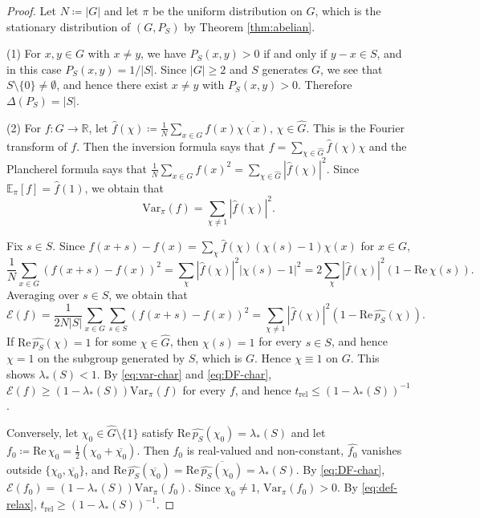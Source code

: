 \documentclass[a4paper, reqno, 11pt]{amsart}
\theoremstyle{definition}
\begin{document}
\begin{proof}
Let $N \coloneqq |G|$ and let $\pi$ be the uniform distribution on $G$, which is the stationary distribution of $(G, P_{S})$ by Theorem \ref{thm:abelian}.

(1)
For $x, y \in G$ with $x \ne y$, we have $P_{S}(x,y) > 0$ if and only if $y - x \in S$, and in this case $P_{S}(x,y) = 1/|S|$.
Since $|G| \ge 2$ and $S$ generates $G$, we see that $S \setminus \{0\} \ne \emptyset$, and hence there exist $x \ne y$ with $P_{S}(x,y) > 0$.
Therefore $\Delta(P_{S}) = |S|$.

(2)
For $f \colon G \to \mathbb{R}$, let $\widehat{f}(\chi) \coloneqq \frac{1}{N} \sum_{x \in G} f(x) \overline{\chi(x)}$, $\chi \in \widehat{G}$. 
This is the Fourier transform of $f$. 
Then the inversion formula says that $f = \sum_{\chi \in \widehat{G}} \widehat{f}(\chi) \chi$ and the Plancherel formula says that $\frac{1}{N} \sum_{x \in G} f(x)^{2} = \sum_{\chi \in \widehat{G}} |\widehat{f}(\chi)|^{2}$.
Since $\mathbb{E}_{\pi}[f] = \widehat{f}(1)$, we obtain that 
\begin{equation}\label{eq:var-char}
\mathrm{Var}_{\pi}(f) = \sum_{\chi \ne 1} |\widehat{f}(\chi)|^{2}. 
\end{equation} 

Fix $s \in S$. Since $f(x+s) - f(x) = \sum_{\chi} \widehat{f}(\chi) \left(\chi(s) - 1\right) \chi(x)$ for $x \in G$,
\[ \frac{1}{N} \sum_{x \in G} \left(f(x+s) - f(x)\right)^{2} = \sum_{\chi} |\widehat{f}(\chi)|^{2} \left|\chi(s) - 1\right|^{2}  = 2 \sum_{\chi} |\widehat{f}(\chi)|^{2} \left(1 - \mathrm{Re}\,\chi(s)\right). \]
Averaging over $s \in S$, we obtain that 
\begin{equation}\label{eq:DF-char} 
\mathcal{E}(f) = \frac{1}{2N|S|} \sum_{x \in G} \sum_{s \in S} \left(f(x+s) - f(x)\right)^{2}   = \sum_{\chi \ne 1} |\widehat{f}(\chi)|^{2} \left(1 - \mathrm{Re}\, \widehat{p_{S}}(\chi)\right). 
\end{equation}
If $\mathrm{Re}\, \widehat{p_{S}}(\chi) = 1$ for some $\chi \in \widehat{G}$, then $\chi(s) = 1$ for every $s \in S$, and hence $\chi = 1$ on the subgroup generated by $S$, which is $G$. 
Hence $\chi \equiv 1$ on $G$. 
This shows $\lambda_{*}(S) < 1$. 
By \eqref{eq:var-char} and \eqref{eq:DF-char}, 
$\mathcal{E}(f) \ge \left(1 - \lambda_{*}(S)\right) \mathrm{Var}_{\pi}(f)$ for every $f$,
and hence $t_{\mathrm{rel}} \le \left(1 - \lambda_{*}(S)\right)^{-1}$.


Conversely, let $\chi_{0} \in \widehat{G} \setminus \{1\}$ satisfy $\mathrm{Re}\, \widehat{p_{S}}(\chi_{0}) = \lambda_{*}(S)$ and let $f_{0} \coloneqq \mathrm{Re}\, \chi_{0} = \frac{1}{2}\left(\chi_{0} + \overline{\chi_{0}}\right)$.
Then $f_{0}$ is real-valued and non-constant, $\widehat{f_{0}}$ vanishes outside $\{\chi_{0}, \overline{\chi_{0}}\}$,
and $\mathrm{Re}\, \widehat{p_{S}}(\overline{\chi_{0}}) = \mathrm{Re}\, \overline{\widehat{p_{S}}(\chi_{0})} = \lambda_{*}(S)$.
By \eqref{eq:DF-char}, 
$\mathcal{E}(f_{0}) = \left(1 - \lambda_{*}(S)\right) \mathrm{Var}_{\pi}(f_{0})$. 
Since $\chi_0 \ne 1$, $\mathrm{Var}_{\pi}(f_{0}) > 0$. 
By \eqref{eq:def-relax}, $t_{\mathrm{rel}} \ge \left(1 - \lambda_{*}(S)\right)^{-1}$.


\end{proof}
\end{document}
